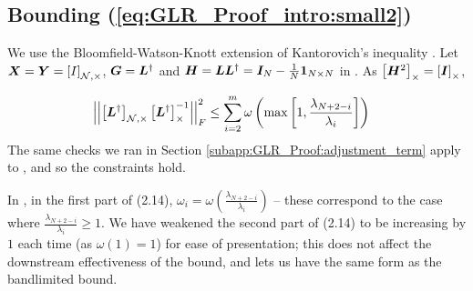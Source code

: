 \subsection{Bounding  (\ref{eq:GLR_Proof_intro:small2})}
\label{subapp:GLR_Proof:off_diag_err}
We use the Bloomfield-Watson-Knott extension of Kantorovich's inequality \cite[Thm 5]{khatri1982some}. Let $\matr{X} = \matr{Y} = \msub[\set{N},\Theta]{I}$, $\bm{G}=\bm{L}^{\dagger}$ and $\bm{H} = \bm{L}\bm{L}^{\dagger} =\bm{I}_{N} - \frac{1}{N}\bm{1}_{N \times N}$ in \cite[Thm 5]{khatri1982some}. As $\msub[\Theta]{\matr{H}^{2}} = \msub[\Theta]{\matr{I}}$,

\begin{align} 
    &\sqfrob{\msub[N,\Theta]{\matr{L}^{\dagger}}\msub[\Theta]{\matr{L}^{\dagger}}^{-1}} \leq \sum_{i=2}^{m}\omega\left(\max\left[1,\frac{\lambda_{N+2-i}}{\lambda_{i}}\right]\right)
\end{align}
The same checks we ran in Section \ref{subapp:GLR_Proof:adjustment_term} apply to \cite[Thm 5]{khatri1982some}, and so the constraints hold.

In \cite[Thm 5]{khatri1982some}, in the first part of (2.14), $\omega_{i} = \omega\left(\frac{\lambda_{N+2-i}}{\lambda_{i}}\right)$ -- these correspond to the case where $\frac{\lambda_{N+2-i}}{\lambda_{i}} \geq 1$. We have weakened the second part of (2.14) to be increasing by $1$ each time (as $\omega(1)=1$) for ease of presentation; this does not affect the downstream effectiveness of the bound, and lets us have the same form as the bandlimited bound.

